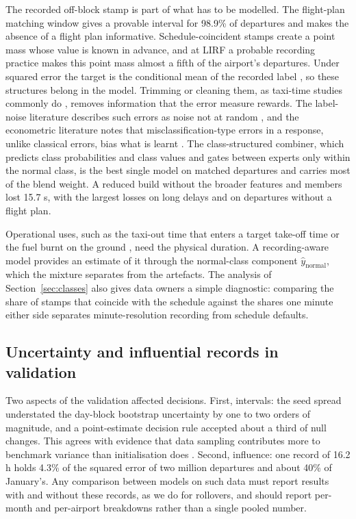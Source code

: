 \documentclass[
  manuscript=article,  %
  layout=preprint,  %
  year=20xx,
  volume=x,
]{extra/joas}
\begin{document}
The recorded off-block stamp is part of what has to be modelled. The flight-plan matching window gives a provable interval for 98.9\% of departures and makes the absence of a flight plan informative. Schedule-coincident stamps create a point mass whose value is known in advance, and at LIRF a probable recording practice makes this point mass almost a fifth of the airport's departures. Under squared error the target is the conditional mean of the recorded label \cite{gneiting2011making}, so these structures belong in the model. Trimming or cleaning them, as taxi-time studies commonly do \cite{wang2021aircraft,swatowska2025generalisable}, removes information that the error measure rewards. The label-noise literature describes such errors as noise not at random \cite{frenay2014classification}, and the econometric literature notes that misclassification-type errors in a response, unlike classical errors, bias what is learnt \cite{hausman2001mismeasured}. The class-structured combiner, which predicts class probabilities and class values and gates between experts only within the normal class, is the best single model on matched departures and carries most of the blend weight. A reduced build without the broader features and members lost 15.7 s, with the largest losses on long delays and on departures without a flight plan.

Operational uses, such as the taxi-out time that enters a target take-off time \cite{eurocontrol2017airport} or the fuel burnt on the ground \cite{khadilkar2012estimation}, need the physical duration. A recording-aware model provides an estimate of it through the normal-class component $\hat{y}_{\mathrm{normal}}$, which the mixture separates from the artefacts. The analysis of Section~\ref{sec:classes} also gives data owners a simple diagnostic: comparing the share of stamps that coincide with the schedule against the shares one minute either side separates minute-resolution recording from schedule defaults.

\subsection{Uncertainty and influential records in validation}

Two aspects of the validation affected decisions. First, intervals: the seed spread understated the day-block bootstrap uncertainty by one to two orders of magnitude, and a point-estimate decision rule accepted about a third of null changes. This agrees with evidence that data sampling contributes more to benchmark variance than initialisation does \cite{bouthillier2021accounting}. Second, influence: one record of 16.2 h holds 4.3\% of the squared error of two million departures and about 40\% of January's. Any comparison between models on such data must report results with and without these records, as we do for rollovers, and should report per-month and per-airport breakdowns rather than a single pooled number.
\end{document}
